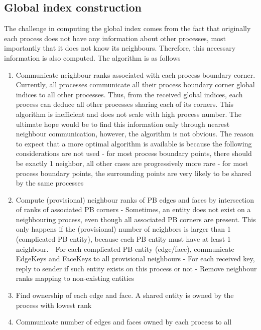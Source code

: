 \subsection{Global index construction}
\label{impl-grid-constructor-globalindex}

\noindent
The challenge in computing the global index comes from the fact that originally each process does not have any information about other processes, most importantly that it does not know its neighbours. Therefore, this necessary information is also computed. The algorithm is as follows

\begin{enumerate}
	\item Communicate neighbour ranks associated with each process boundary corner. Currently, all processes communicate all their process boundary corner global indices to all other processes. Thus, from the received global indices, each process can deduce all other processes sharing each of its corners. This algorithm is inefficient and does not scale with high process number. The ultimate hope would be to find this information only through nearest neighbour communication, however, the algorithm is not obvious. The reason to expect that a more optimal algorithm is available is because the following considerations are not used
	  \subitem - for most process boundary points, there should be exactly 1 neighbor, all other cases are progressively more rare
	  \subitem - for most process boundary points, the surrounding points are very likely to be shared by the same processes
	\item Compute (provisional) neighbour ranks of PB edges and faces by intersection of ranks of associated PB corners
      \subitem - Sometimes, an entity does not exist on a neighbouring process, even though all associated PB corners are present. This only happens if the (provisional) number of neighbors is larger than 1 (complicated PB entity), because each PB entity must have at least 1 neighbour.
       \subitem - For each complicated PB entity (edge/face), communicate EdgeKeys and FaceKeys to all provisional neighbours
       \subitem - For each received key, reply to sender if such entity exists on this process or not
       \subitem - Remove neighbour ranks mapping to non-existing entities
    \item Find ownership of each edge and face. A shared entity is owned by the process with lowest rank
    \item Communicate number of edges and faces owned by each process to all

\end{enumerate}
